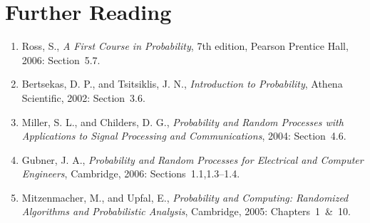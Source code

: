

\section*{Further Reading}

\begin{small}
\begin{enumerate}
\item Ross, S., \emph{A First Course in Probability}, 7th edition, Pearson Prentice Hall, 2006: Section~5.7.
\item Bertsekas, D. P., and Tsitsiklis, J. N., \emph{Introduction to Probability}, Athena Scientific, 2002: Section~3.6.
\item Miller, S. L., and Childers, D. G., \emph{Probability and Random Processes with Applications to Signal Processing and Communications}, 2004: Section~4.6.
\item Gubner, J. A., \emph{Probability and Random Processes for Electrical and Computer Engineers}, Cambridge, 2006: Sections~1.1,1.3--1.4.

\item Mitzenmacher, M., and Upfal, E., \emph{Probability and Computing: Randomized Algorithms and Probabilistic Analysis}, Cambridge, 2005: Chapters~1~\&~10.
\end{enumerate}
\end{small}

